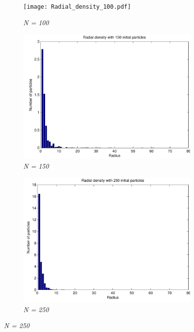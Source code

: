 \documentclass[a4paper,12pt, english]{article}
\begin{document}
\begin{figure}[H]
	\centering
        \begin{subfigure}[b]{0.6\textwidth}
        \texttt{[image: Radial\_density\_100.pdf]}
        \caption{\textit{N = 100}}
        
		\end{subfigure}
		
		\begin{subfigure}[b]{0.6\textwidth}
        \includegraphics[scale=0.5]{Radial_density_150.pdf}
        \caption{\textit{N = 150}}
		\end{subfigure}
		
		\begin{subfigure}[b]{0.6\textwidth}
        \includegraphics[scale=0.5]{radial_density_250.pdf}
        \caption{\textit{N = 250}}
		\end{subfigure}
		

\end{figure}
\end{document}
